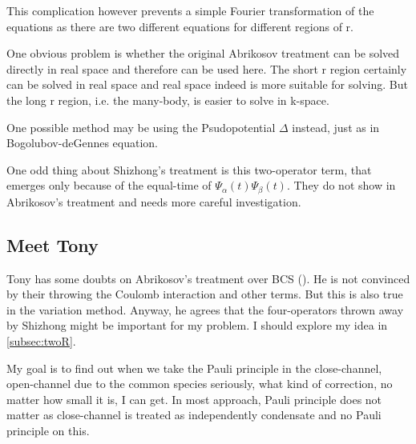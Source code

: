 This complication however prevents a simple Fourier transformation of the equations as there are two different equations for different regions of r.  

One obvious problem is whether the original Abrikosov treatment can be solved directly in real space and therefore can be used here.  The short r region certainly can be solved in real space and real space indeed is more suitable for solving.  But the long r region, i.e. the many-body, is easier to solve in k-space.  

One possible method may be using the Psudopotential $\Delta$ instead, just as in Bogolubov-deGennes equation.  

One odd thing about Shizhong's treatment is this two-operator term, that emerges only because of the equal-time of $\Psi_\alpha(t)\Psi_\beta(t)$.  They do not show in Abrikosov's treatment and needs more careful investigation.  

\subsection{Meet Tony}
Tony has some doubts on Abrikosov's treatment over BCS (\cite{Abrikosov}).  He is not convinced by their throwing the Coulomb interaction and other terms.  But this is also true in the variation method.   Anyway, he agrees that the four-operators thrown away by Shizhong might be important for my problem.  I should explore my idea in \ref{subsec:twoR}. 

My goal is to find out when we take the Pauli principle in the close-channel, open-channel due to the common species seriously, what kind of correction, no matter how small it is, I can get.  In most approach, Pauli principle does not matter as close-channel is treated as independently condensate and no Pauli principle on this.  

